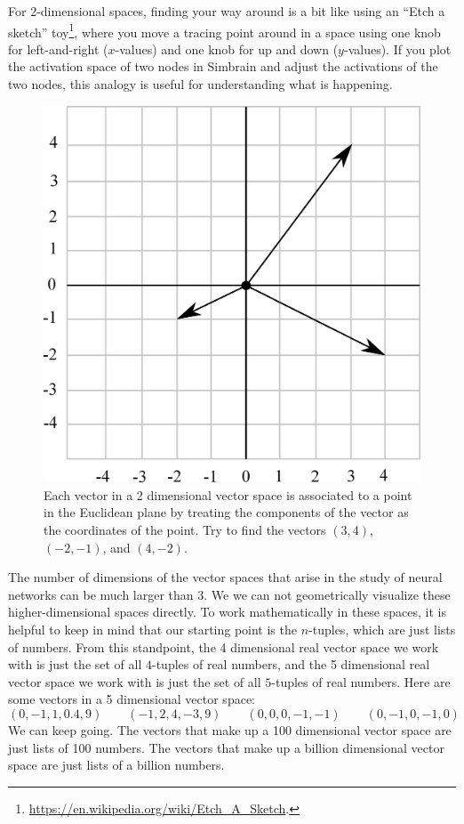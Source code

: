 For 2-dimensional spaces, finding your way around is a bit like using an ``Etch a sketch'' toy\footnote{\url{https://en.wikipedia.org/wiki/Etch_A_Sketch}.}, where you move a tracing point around in a space using one knob for left-and-right ($x$-values) and one knob for up and down ($y$-values). If you plot the activation space of two nodes in Simbrain and adjust the activations of the two nodes, this analogy is useful for understanding what is happening.

\begin{figure}[h]
\centering
\includegraphics[scale=0.175]{./images/grid2.png}
\caption[Scott Hotton.]{Each vector in a 2 dimensional vector space is associated to a point 
in the Euclidean plane by treating the components of the vector as the 
coordinates of the point. Try to find the vectors $(3,4)$, $(-2,-1)$, and 
$(4,-2)$.} 
\label{2d}
\end{figure}

   The number of dimensions of the vector spaces that arise in the study of 
neural networks can be much larger than 3. We we can not geometrically visualize these higher-dimensional spaces directly. To work mathematically in 
these spaces, it is helpful to keep in mind that our starting point is the 
$n$-tuples, which are just lists of numbers. From this standpoint, the 4 
dimensional real vector space we work with is just the set of all $4$-tuples of
real numbers, and the 5 dimensional real vector space we work with is just the 
set of all $5$-tuples of real numbers. Here are some vectors in a 5 
dimensional vector space:
\begin{equation*}
    (0,-1, 1, 0.4, 9)  \qquad
    (-1, 2, 4, -3, 9)  \qquad 
    (0, 0, 0, -1, -1 ) \qquad
    (0, -1, 0, -1, 0 ) 
\end{equation*}
We can keep going. The vectors that make up a 100 dimensional vector space are 
just lists of 100 numbers. The vectors that make up a billion dimensional 
vector space are just lists of a billion numbers. 

